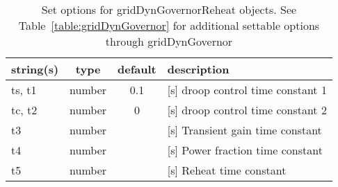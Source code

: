 \begin{table}[ht]
\centering
\begin{tabular}{p{5cm} c c p{7cm}}
\hline
string(s) & type & default & description \\
\hline
ts, t1 & number & 0.1 & [s]   droop control time constant 1\\
tc, t2 & number & 0 & [s]   droop control  time constant 2\\
t3 & number &  & [s]    Transient gain time constant\\
t4 & number &  & [s]    Power fraction time constant\\
t5 & number &  & [s]    Reheat time constant\\
\hline
\end{tabular}
\caption{Set options for gridDynGovernorReheat objects. See Table~\ref{table:gridDynGovernor} for additional settable options through gridDynGovernor}
\label{table:gridDynGovernorReheat}
\end{table}

